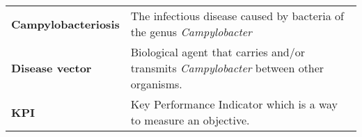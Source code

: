 
\begin{table}[ht!]
\begin{tabular}{lm{45em}}
 \textbf{Campylobacteriosis} & The infectious disease caused by bacteria of the genus \emph{Campylobacter} \\
  \textbf{Disease vector} & Biological agent that carries and/or transmits \textit{Campylobacter} between other organisms. \\
  \textbf{KPI} & Key Performance Indicator which is a way to measure an objective.
\end{tabular}
\end{table}

